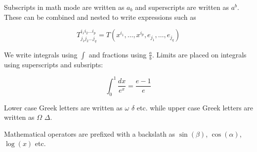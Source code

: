 \documentclass{article}
\begin{document}
Subscripts in math mode are written as $a_b$ and superscripts are written as $a^b$. These can be combined and nested to write expressions such as

\[ T^{i_1 i_2 \dots i_p}_{j_1 j_2 \dots j_q} = T(x^{i_1},\dots,x^{i_p},e_{j_1},\dots,e_{j_q}) \]

We write integrals using $\int$ and fractions using $\frac{a}{b}$. Limits are placed on integrals using superscripts and subsripts:

\[ \int_0^1 \frac{dx}{e^x} = \frac{e-1}{e} \]

Lower case Greek letters are written as $\omega$ $\delta$ etc.
while upper case Greek letters are written as $\Omega$ $\Delta$.

Mathematical operators are prefixed with a backslath as $\sin(\beta)$, $\cos(\alpha)$, $\log(x)$ etc.
\end{document}
